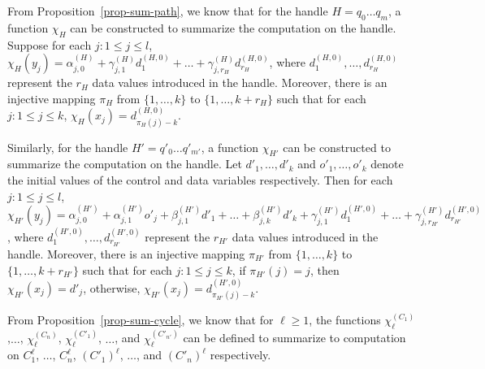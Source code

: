 \documentclass[runningheads,a4paper]{llncs}
\begin{document}
From Proposition~\ref{prop-sum-path}, we know that 
for the handle $H = q_0 \dots q_m$, a function $\chi_H$ can be constructed to summarize the computation on the handle. Suppose for each $j: 1 \le j \le l$,  $\chi_H(y_j) = \alpha^{(H)}_{j,0} + \gamma^{(H)}_{j,1} d^{(H,0)}_1 + \dots + \gamma^{(H)}_{j,r_H} d^{(H,0)}_{r_H}$, where $d^{(H,0)}_1,\dots, d^{(H,0)}_{r_H}$ represent the $r_H$ data values introduced in the handle. Moreover, there is an injective mapping $\pi_H$ from $\{1,\dots,k\}$ to $\{1,\dots,k+r_H\}$ such that for each $j: 1 \le j \le k$, $\chi_H(x_j) = d^{(H,0)}_{\pi_H(j)-k}$.

Similarly, for the handle $H' = q'_0 \dots q'_{m'}$, a function $\chi_{H'}$ can be constructed to summarize the computation on the handle. Let $d'_1,\dots,d'_k$ and $o'_1,\dots,o'_k$ denote the initial values of the control and data variables respectively. Then for each $j: 1 \le j \le l$,  $\chi_{H'}(y_j) = \alpha^{(H')}_{j,0} + \alpha^{(H')}_{j,1} o'_j + \beta^{(H')}_{j,1} d'_1 + \dots + \beta^{(H')}_{j,k} d'_{k}+ \gamma^{(H')}_{j,1} d^{(H',0)}_1 + \dots + \gamma^{(H')}_{j,r_{H'}} d^{(H',0)}_{r_{H'}}$, where $d^{(H',0)}_1,\dots, d^{(H',0)}_{r_{H'}}$ represent the $r_{H'}$ data values introduced in the handle. Moreover, there is an injective mapping $\pi_{H'}$ from $\{1,\dots,k\}$ to $\{1,\dots,k+r_{H'}\}$ such that for each $j: 1 \le j \le k$, if $\pi_{H'}(j)=j$, then $\chi_{H'}(x_j) = d'_j$, otherwise, $\chi_{H'}(x_j) = d^{(H',0)}_{\pi_{H'}(j)-k}$.

From Proposition~\ref{prop-sum-cycle}, we know that for $\ell \ge 1$, the functions $\chi^{(C_1)}_{\ell}$,$\dots$, $\chi^{(C_n)}_{\ell}$, $\chi^{(C'_1)}_{\ell}$, $\dots$, and $\chi^{(C'_{n'})}_{\ell}$ can be defined to summarize to computation on $C^{\ell}_1$, $\dots$, $C^{\ell}_n$, $(C'_1)^{\ell}$, $\dots$, and $(C'_n)^{\ell}$ respectively. 
\end{document}
